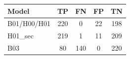 \begin{tabular}{lcccc}
\hline
Model & TP & FN & FP & TN \\
\hline
B01/H00/H01 & 220 & 0 & 22 & 198 \\
H01\_sec & 219 & 1 & 11 & 209 \\
B03 & 80 & 140 & 0 & 220 \\
\hline
\end{tabular}
